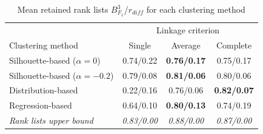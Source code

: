\begin{table}[t]
  \centering
  \caption{Mean retained rank lists $B^{3}_{F_1}$/$r_{diff}$ for each clustering method}
  \label{tab:clustering_evaluation_summary}
  \begin{tabular}{l c c c}
    \toprule
                                       & \multicolumn{3}{c}{Linkage criterion} \\
    Clustering method                  & Single         & Average            & Complete \\
    \midrule
    Silhouette-based ($\alpha = 0$)    & 0.74/0.22      & \textbf{0.76/0.17} & 0.75/0.17 \\
    Silhouette-based ($\alpha = -0.2$) & 0.79/0.08      & \textbf{0.81/0.06} & 0.80/0.06 \\
    Distribution-based                 & 0.22/0.16      & 0.76/0.06          & \textbf{0.82/0.07} \\
    Regression-based                   & 0.64/0.10      & \textbf{0.80/0.13} & 0.74/0.19 \\
    \midrule
    \textit{Rank lists upper bound}    & \textit{0.83/0.00} & \textit{0.88/0.00} & \textit{0.87/0.00} \\
    \bottomrule
  \end{tabular}
\end{table}
